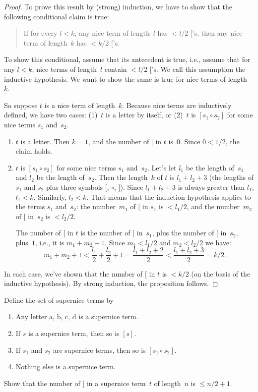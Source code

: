 \documentclass[../../../include/open-logic-section]{subfiles}
\begin{document}
\begin{proof}
To prove this result by (strong) induction, we have to show that the
following conditional claim is true:
\begin{quote}
  If for every $l < k$, any nice term of length~$l$ has $< l/2$
  $[$'s, then any nice term of length~$k$ has $< k/2$ $[$'s.
\end{quote}
To show this conditional, assume that its antecedent is true, i.e.,
assume that for any $l<k$, nice terms of length~$l$ contain $< l/2$
$[$'s.  We call this assumption the inductive hypothesis. We want to
show the same is true for nice terms of length~$k$.

So suppose $t$ is a nice term of length~$k$.  Because nice terms are
inductively defined, we have two cases: (1)~$t$ is a letter by
itself, or (2)~$t$ is $[s_1 \circ s_2]$ for some nice terms $s_1$ and~$s_2$.
\begin{enumerate}
\item $t$ is a letter.  Then $k = 1$, and the number of $[$ in $t$
is~$0$. Since $0 < 1/2$, the claim holds.
\item $t$ is $[s_1 \circ s_2]$ for some nice terms $s_1$ and~$s_2$.
  Let's let $l_1$ be the length of~$s_1$ and $l_2$ be the length
  of~$s_2$.  Then the length~$k$ of $t$ is $l_1+l_2+3$ (the lengths of
  $s_1$ and $s_2$ plus three symbols $[$, $\circ$, $]$). Since
  $l_1+l_2+3$ is always greater than $l_1$, $l_1 < k$. Similarly, $l_2
  < k$. That means that the induction hypothesis applies to the terms
  $s_1$ and~$s_2$: the number~$m_1$ of $[$ in $s_1$ is $< l_1/2$, and
  the number~$m_2$ of $[$ in~$s_2$ is $< l_2/2$.

  The number of $[$ in $t$ is the number of $[$ in~$s_1$, plus the
  number of $[$ in~$s_2$, plus~$1$, i.e., it is $m_1 + m_2 + 1$. Since $m_1
  < l_1/2$ and $m_2 < l_2/2$ we have:
  \[
  m_1 + m_2 + 1 < \frac{l_1}{2} + \frac{l_2}{2} + 1 = \frac{l_1+l_2+2}{2} < \frac{l_1+l_2+3}{2} = k/2.
  \]
\end{enumerate}
In each case, we've shown that the number of $[$ in $t$ is $< k/2$ (on
the basis of the inductive hypothesis). By strong induction, the
proposition follows.
\end{proof}

\begin{prob}
  Define the set of supernice terms by
  \begin{enumerate}
  \item Any letter $\mathrm{a}$, $\mathrm{b}$, $\mathrm{c}$,
    $\mathrm{d}$ is a supernice term.
  \item If $s$ is a supernice term, then so is $[s]$.
  \item If $s_1$ and $s_2$ are supernice terms, then so
    is $[s_1 \circ s_2]$.
  \item Nothing else is a supernice term.
  \end{enumerate}
  Show that the number of $[$ in a supernice term~$t$ of length~$n$ is
    $\le n/2 +1$.
\end{prob}
\end{document}
